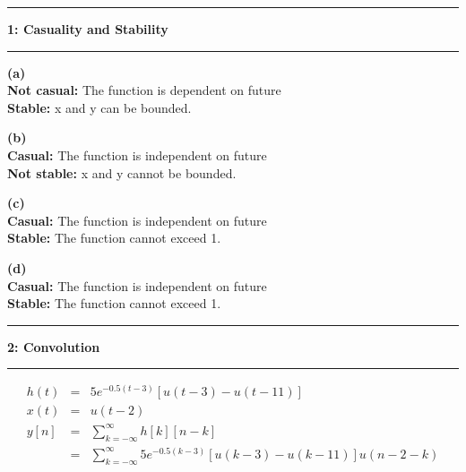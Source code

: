 \documentclass[11pt]{article}
\newcommand\question[2]{\vspace{.25in}\hrule\textbf{#1: #2}\vspace{.5em}\hrule\vspace{.10in}}
\renewcommand\part[1]{\vspace{.10in}\textbf{(#1)}}
\newcommand\tab[1][1cm]{\hspace*{#1}}
\begin{document}
\raggedright
\newcommand\NAME{Kadir Emre Otod}  %
\newcommand\ANDREWID{150140032}     %
\newcommand\HWNUM{3}              %


\question{1}{Casuality and Stability} 

\part{a} \\
\tab \textbf{Not casual:} The function is dependent on future \\
\tab \textbf{Stable:} x and y can be bounded.

\part{b} \\
\tab \textbf{Casual:} The function is independent on future \\
\tab \textbf{Not stable:} x and y cannot be bounded.

\part{c} \\
\tab \textbf{Casual:} The function is independent on future \\
\tab \textbf{Stable:} The function cannot exceed 1.

\part{d} \\
\tab \textbf{Casual:} The function is independent on future \\
\tab \textbf{Stable:} The function cannot exceed 1.


\question{2}{Convolution} 

\begin{eqnarray*}
	h(t) &=& 5e ^ {-0.5(t-3)} [u(t-3) - u(t-11)] \\
	x(t) &=& u(t-2) \\
	y[n] &=& \sum_{k=-\infty}^{\infty} h[k] [n-k] \\
	&=& \sum_{k=-\infty}^{\infty} 5e ^ {-0.5(k-3)} [u(k-3) - u(k-11)]  u(n-2-k)
\end{eqnarray*}
\end{document}

